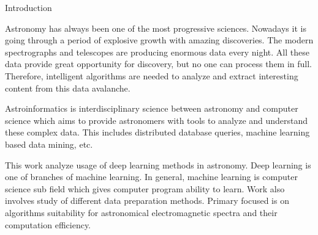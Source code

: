 \chap Introduction

Astronomy has always been one of the most progressive sciences. Nowadays it is
going through a period of explosive growth with amazing discoveries. The modern
spectrographs and telescopes are producing enormous data every night. All these
data provide great opportunity for discovery, but no one can process them
in full. Therefore, intelligent algorithms are needed to analyze and extract
interesting content from this data avalanche.

Astroinformatics is interdisciplinary science between astronomy and
computer science which aims to provide astronomers with tools to analyze and
understand these complex data. This includes distributed database queries,
machine learning based data mining, etc.

This work analyze usage of deep learning methods in astronomy.
Deep learning is one of branches of machine learning. In general, machine
learning is computer science sub field which gives computer program ability to
learn. Work also involves study of different data preparation methods.
Primary focused is on algorithms suitability for astronomical electromagnetic
spectra and their computation efficiency.
